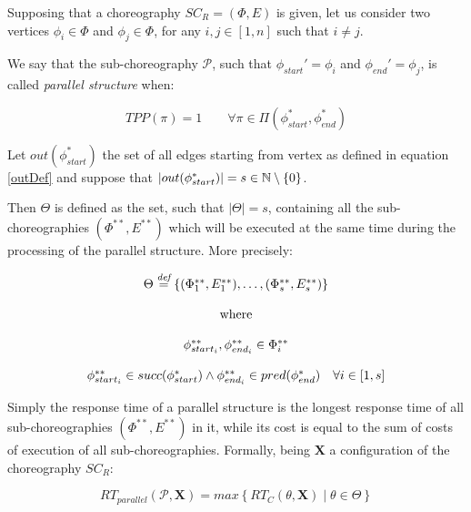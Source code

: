 Supposing that a choreography $SC_R = (\Phi,E)$ is given, let us consider two vertices $\phi_i \in \Phi$ and $\phi_j \in \Phi$, for any $i,j \in \left[ 1, n \right]$ such that $i \neq j$.

We say that the sub-choreography $\mathcal{P}$, such that $\phi_{start}' = \phi_i$ and $\phi_{end}' = \phi_j$, is called \textit{parallel structure} when:

\begin{equation}
	TPP(\pi) = 1 \qquad \forall \pi \in \Pi(\phi_{start}^*, \phi_{end}^*)
\end{equation}

Let $out(\phi_{start}^*)$ the set of all edges starting from vertex as defined in equation \ref{outDef} and suppose that $|out(\phi_{start}^*)| = s \in \mathbb{N} \setminus \left\lbrace 0 \right\rbrace $.

Then $\Theta$ is defined as the set, such that $|\Theta| = s$, containing all the sub-choreographies $(\Phi^{**}, E^{**})$ which will be executed at the same time during the processing of the parallel structure. More precisely:

\begin{equation}
	\begin{array}{c}
	\Theta \overset{\textit{def}}{=} \left\lbrace (\Phi^{**}_1, E^{**}_1), \ldots ,(\Phi^{**}_s, E^{**}_s) \right\rbrace \\\\
	\text{ where } \\\\
	\phi_{start_{i}}^{**}, \phi_{end_{i}}^{**} \in \Phi^{**}_i \\\\
	
	\phi_{start_{i}}^{**} \in succ(\phi_{start}^*) \wedge \phi_{end_{i}}^{**} \in pred (\phi_{end}^*) \quad \forall i \in \left[ 1, s \right]
	\end{array}
\end{equation} 

Simply the response time of a parallel structure is the longest response time of all
sub-choreographies $(\Phi^{**}, E^{**})$ in it, while its cost is equal to the sum of costs of execution of all sub-choreographies. Formally, being $\textbf{X}$ a configuration of the choreography $SC_R$:

\begin{equation}
	RT_{parallel}(\mathcal{P}, \textbf{X}) = max \left\lbrace RT_C(\mathcal{\theta}, \textbf{X}) \mid \theta \in \Theta \right\rbrace 
\end{equation}


